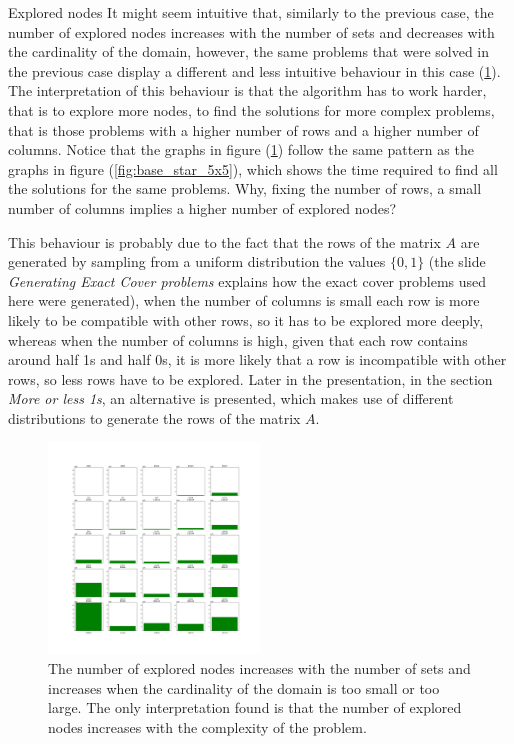 \documentclass{beamer}
\begin{document}
\begin{frame}{Explored nodes}
    It might seem intuitive that, similarly to the previous case, the number of explored nodes
    increases with the number of sets and decreases with the cardinality of the domain,
    however, the same problems that were solved in the previous case display a different
    and less intuitive behaviour in this case (\ref{fig:explored_5x5}).
    The interpretation of this behaviour is that the algorithm has to work harder,
    that is to explore more nodes, to find the solutions for more complex problems, that
    is those problems with a higher number of rows and a higher number of columns.
    Notice that the graphs in figure (\ref{fig:explored_5x5}) follow the same pattern
    as the graphs in figure (\ref{fig:base_star_5x5}), which shows the time required to find all
    the solutions for the same problems.
    Why, fixing the number of rows, a small number of columns implies a higher
    number of explored nodes? 
\end{frame}    

\begin{frame}{}    
    This behaviour is probably due to the fact that the rows
    of the matrix $A$ are generated by sampling from a uniform distribution the values 
    $\{0, 1\}$ (the slide \textit{Generating Exact Cover problems} explains how 
    the exact cover problems used here were generated), when the number of columns is small each row is more likely to be 
    compatible with other rows, so it has to be explored more deeply, whereas when the 
    number of columns is high, given that each row contains around half 1s and half 0s,
    it is more likely that a row is incompatible with other rows, so less rows have to be 
    explored.
    Later in the presentation, in the section \textit{More or less 1s}, an alternative is presented,
    which makes use of different distributions to generate the rows of the matrix $A$.
\end{frame}

\begin{frame}
    \begin{figure}
        \centering
        \includegraphics[width=0.5\textwidth]{explored_5x5.pdf}
        \caption{The number of explored nodes increases with the number of sets and increases
        when the cardinality of the domain is too small or too large. The only interpretation
        found is that the number of explored nodes increases with the complexity of the problem.}
        \label{fig:explored_5x5}
    \end{figure}
\end{frame}
\end{document}
